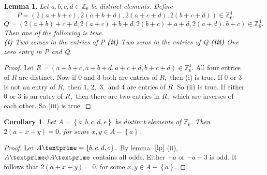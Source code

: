 \documentclass[reqno,10pt]{amsart}
\newtheorem{definition}[prop]{Definition}
\newtheorem{lem}[prop]{ Lemma}
\newtheorem{cor}[prop]{Corollary}
\begin{document}
\begin{lem} 
\label{fourzero}
Let $a,b,c,d \in  \mathbb{Z}_6$ be distinct elements. Define
$$ P = \left(2(a+b+c),2(a+b+d),2(a+c+d),2(b+c+d) \right) \in \mathbb{Z}_6^4. $$ $$ Q = \left( 2(a+b)+c+d,2(a+c)+b+d,2(b+c)+a+d,2(a+d),b+c \right) \in \mathbb{Z}_6^4. $$ Then one of the following is true.\\
\textbf{(i)} Two zeroes in the entries of P
\textbf{(ii)} Two zeros in the entries of Q
\textbf{(iii)} One zero entry in P and Q.
\end{lem}
\begin{proof} Let $R = \left( a+b+c,a+b+d,a+c+d,b+c+d\right) \in \mathbb{Z}_6^4.$ All four entries of $R$ are distinct. Now if $ 0$ and $3$ both are entries of $R,$ then (i) is true.  If $0$ or $3$ is not an entry of $R,$ then $1$, $2,$ $3,$ and $4$ are entries of $R.$ So (ii) is true.  If either $0$ or $3$ is an entry of $R,$ then there are two entries in $R,$ which are inverses of each other. So (iii) is true.
\end{proof}
\begin{cor}
\label{maincor} Let $A = \left\lbrace a, b,c,d,e \right\rbrace$ be distinct elements of $\mathbb{Z}_6.$   Then $2(a+x+y) = 0$, for some $x,y \in A - \left\lbrace a \right\rbrace.$
\end{cor}
\begin{proof} Let $A \textprime = \left\lbrace b,c,d,e \right\rbrace.$
By lemma $~\ref{lp}$ (ii), $A\textprime \psi A\textprime$ contains all odds. Either $-a$ or $-a+3$ is odd. It follows that  $2(a+x+y) = 0$, for some $x,y \in A - \left\lbrace a \right\rbrace.$
\end{proof}

\end{document}
